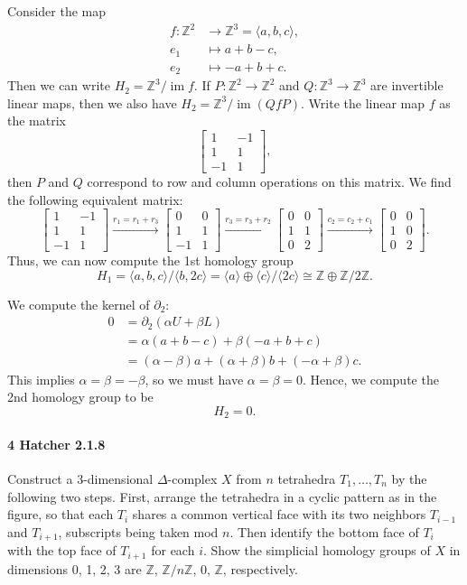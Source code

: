 \documentclass[12pt]{article}
\newlength{\myparskip}
\newenvironment{fullbox}{\begin{lrbox}{\savefullbox}\begin{minipage}{\dimexpr\textwidth-2\fboxsep\relax}\setlength{\parskip}{\myparskip}}{\end{minipage}\end{lrbox}\framebox[\textwidth]{\usebox{\savefullbox}}}
\newenvironment{pbox}[1][]{\begin{fullbox}\def\temp{#1}\ifx\temp\empty\else\paragraph{#1}\phantom{}\fi}{\end{fullbox}}
\theoremstyle{definition}
\newcommand{\Z}{\mathbb{Z}}
\newcommand{\<}{\langle}
\renewcommand{\>}{\rangle}
\newcommand{\iso}{\cong}
\DeclareMathOperator{\im}{im}
\newcommand{\mat}[1]{\begin{bmatrix}#1\end{bmatrix}}
\newcommand{\bd}{\partial}
\begin{document}
Consider the map
\begin{align*}
    f : \Z^2 &\longrightarrow \Z^3 = \<a, b, c\>, \\
        e_1 &\longmapsto a + b - c, \\
        e_2 &\longmapsto -a + b + c.
\end{align*}
Then we can write $H_2 = \Z^3 / \im f$.
If $P : \Z^2 \to \Z^2$ and $Q : \Z^3 \to \Z^3$ are invertible linear maps, then we also have $H_2 = \Z^3/\im(QfP)$.
Write the linear map $f$ as the matrix
\[
    \mat{1 & -1 \\ 1 & 1 \\ -1 & 1},
\]
then $P$ and $Q$ correspond to row and column operations on this matrix.
We find the following equivalent matrix:
\[
    \mat{1 & -1 \\ 1 & 1 \\ -1 & 1}
    \xrightarrow{r_1 = r_1 + r_3}
    \mat{0 & 0 \\ 1 & 1 \\ -1 & 1}
    \xrightarrow{r_3 = r_3 + r_2}
    \mat{0 & 0 \\ 1 & 1 \\ 0 & 2}
    \xrightarrow{c_2 = c_2 + c_1}
    \mat{0 & 0 \\ 1 & 0 \\ 0 & 2}.
\]
Thus, we can now compute the 1st homology group
\[
    H_1
        = \<a, b, c\> / \<b, 2c\>
        = \<a\> \oplus \<c\>/\<2c\>
        \iso \Z \oplus \Z/2\Z.
\]

We compute the kernel of $\bd_2$:
\begin{align*}
    0
        &= \bd_2(\alpha U + \beta L) \\
        &= \alpha(a + b - c) + \beta(-a + b + c) \\
        &= (\alpha - \beta)a + (\alpha + \beta)b + (-\alpha + \beta)c.
\end{align*}
This implies $\alpha = \beta = -\beta$, so we must have $\alpha = \beta = 0$.
Hence, we compute the 2nd homology group to be
\[
    H_2 = 0.
\]


\newpage
\begin{pbox}[4 Hatcher 2.1.8]
    Construct a $3$-dimensional $\Delta$-complex $X$ from $n$ tetrahedra $T_1, \dots, T_n$ by the following two steps.
    First, arrange the tetrahedra in a cyclic pattern as in the figure, so that each $T_i$ shares a common vertical face with its two neighbors $T_{i-1}$ and $T_{i+1}$, subscripts being taken mod $n$.
    Then identify the bottom face of $T_i$ with the top face of $T_{i+1}$ for each $i$.
    Show the simplicial homology groups of $X$ in dimensions 0, 1, 2, 3 are $\Z$, $\Z/n\Z$, 0, $\Z$, respectively.
\end{pbox}
\end{document}
